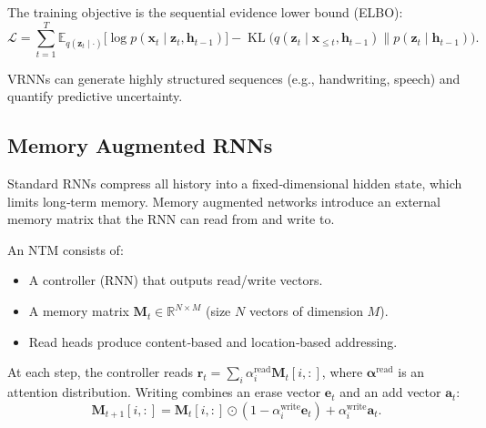 \documentclass{tufte-handout}
\begin{document}
The training objective is the sequential evidence lower bound (ELBO):
\[
\mathcal{L} = \sum_{t=1}^T \mathbb{E}_{q(\mathbf{z}_t \mid \cdot)} \bigl[ \log p(\mathbf{x}_t \mid \mathbf{z}_t, \mathbf{h}_{t-1}) \bigr] - \operatorname{KL}\bigl( q(\mathbf{z}_t \mid \mathbf{x}_{\le t}, \mathbf{h}_{t-1}) \| p(\mathbf{z}_t \mid \mathbf{h}_{t-1}) \bigr).
\]

\begin{marginfigure}
\centering
{}
\caption{VRNN: deterministic RNN hidden states $\mathbf{h}_t$ and stochastic latents $\mathbf{z}_t$ interact.}
\end{marginfigure}

VRNNs can generate highly structured sequences (e.g., handwriting, speech) and quantify predictive uncertainty.

\subsection{Memory Augmented RNNs}

Standard RNNs compress all history into a fixed‑dimensional hidden state, which limits long‑term memory. Memory augmented networks introduce an external memory matrix that the RNN can read from and write to.

\begin{defn}
    An NTM consists of:
    \begin{itemize}
        \item A controller (RNN) that outputs read/write vectors.
        \item A memory matrix $\mathbf{M}_t \in \mathbb{R}^{N \times M}$ (size $N$ vectors of dimension $M$).
        \item Read heads produce content‑based and location‑based addressing.
    \end{itemize}
    At each step, the controller reads $\mathbf{r}_t = \sum_i \alpha_i^{\text{read}} \mathbf{M}_t[i,:]$, where $\boldsymbol{\alpha}^{\text{read}}$ is an attention distribution.
    Writing combines an erase vector $\mathbf{e}_t$ and an add vector $\mathbf{a}_t$:
    \[
    \mathbf{M}_{t+1}[i,:] = \mathbf{M}_t[i,:] \odot (1 - \alpha_i^{\text{write}} \mathbf{e}_t) + \alpha_i^{\text{write}} \mathbf{a}_t.
    \]
\end{defn}
\end{document}
